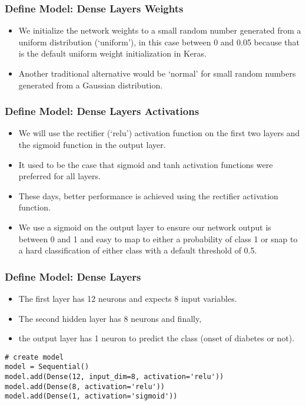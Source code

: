 \begin{frame}[fragile] \frametitle{Define Model: Dense Layers Weights}
 \begin{itemize}
\item  We initialize the network weights to a small random number generated from a uniform distribution (`uniform'), in this case between 0 and 0.05 because that is the default uniform weight initialization in Keras. 
\item Another traditional alternative would be `normal' for small random numbers generated from a Gaussian distribution.
\end{itemize}
\end{frame}

\begin{frame}[fragile] \frametitle{Define Model: Dense Layers Activations}
 \begin{itemize}
\item  We will use the rectifier (`relu') activation function on the first two layers and the sigmoid function in the output layer.
\item It used to be the case that sigmoid and tanh activation functions were preferred for all layers. 
\item These days, better performance is achieved using the rectifier activation function. 
\item We use a sigmoid on the output layer to ensure our network output is between 0 and 1 and easy to map to either a probability of class 1 or snap to a hard classification of either class with a default threshold of 0.5.
\end{itemize}
\end{frame}


\begin{frame}[fragile] \frametitle{Define Model: Dense Layers}
 \begin{itemize}
\item  The first layer has 12 neurons and expects 8 input variables. 
\item The second hidden layer has 8 neurons and finally,
\item the output layer has 1 neuron to predict the class (onset of diabetes or not).
\end{itemize}
\begin{lstlisting}
# create model
model = Sequential()
model.add(Dense(12, input_dim=8, activation='relu'))
model.add(Dense(8, activation='relu'))
model.add(Dense(1, activation='sigmoid'))
\end{lstlisting}
\end{frame}


